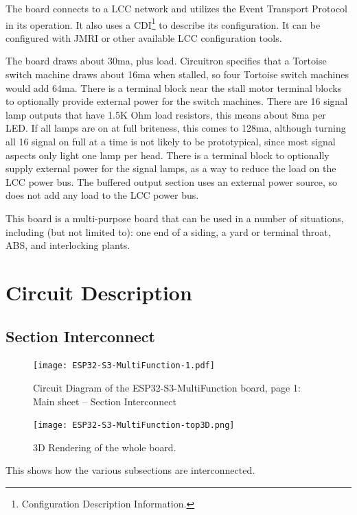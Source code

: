 The board connects to a LCC network and utilizes the Event Transport Protocol
in its operation. It also uses a CDI\footnote{Configuration Description
Information.} to describe its configuration. It can be configured with JMRI or
other available LCC configuration tools.

The board draws about 30ma, plus load. Circuitron specifies that a Tortoise
switch machine draws about 16ma when stalled, so four Tortoise switch machines
would add 64ma. There is a terminal block near the stall motor terminal blocks
to optionally provide external power for the switch machines. There are 16
signal lamp outputs that have 1.5K Ohm load resistors, this means about 8ma
per LED. If all lamps are on at full briteness, this comes to 128ma, although
turning all 16 signal on full at a time is not likely to be prototypical,
since most signal aspects only light one lamp per head. There is a terminal
block to optionally supply external power for the signal lamps, as a way to
reduce the load on the LCC power bus. The buffered output section uses an
external power source, so does not add any load to the LCC power bus.

This board is a multi-purpose board that can be used in a number of 
situations, including (but not limited to): one end of a siding, a yard or 
terminal throat, ABS, and interlocking plants.

\clearpage
\section{Circuit Description}

\subsection{Section Interconnect}
\begin{figure}[hbpt]\begin{centering}%
\texttt{[image: ESP32-S3-MultiFunction-1.pdf]}
\caption{Circuit Diagram of the ESP32-S3-MultiFunction board, page 1: Main 
sheet -- Section Interconnect}
\end{centering}\end{figure}
\begin{figure}[hbpt]\begin{centering}%
\texttt{[image: ESP32-S3-MultiFunction-top3D.png]}
\caption{3D Rendering of the whole board.}
\end{centering}\end{figure}

This shows how the various subsections are interconnected.
\clearpage
